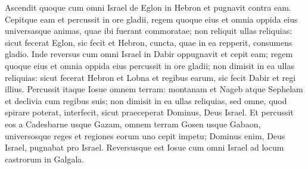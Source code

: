 \begin{biblechapter}
\verse Ascendit quoque cum omni Israel de Eglon in Hebron et pugnavit contra eam.  
\verse Cepitque eam et percussit in ore gladii, regem quoque eius et omnia oppida eius universasque animas, quae ibi fuerant commoratae; non reliquit ullas reliquias: sicut fecerat Eglon, sic fecit et Hebron, cuncta, quae in ea repperit, consumens gladio. 
\verse Inde reversus cum omni Israel in Dabir oppugnavit 
\verse et cepit eam; regem quoque eius et omnia oppida eius percussit in ore gladii; non dimisit in ea ullas reliquias: sicut fecerat Hebron et Lobna et regibus earum, sic fecit Dabir et regi illius. 
\verse Percussit itaque Iosue omnem terram: montanam et Nageb atque Sephelam et declivia cum regibus suis; non dimisit in ea ullas reliquias, sed omne, quod spirare poterat, interfecit, sicut praeceperat Dominus, Deus Israel. 
\verse Et percussit eos a Cadesbarne usque Gazam, omnem terram Gosen usque Gabaon, 
\verse universosque reges et regiones eorum uno cepit impetu; Dominus enim, Deus Israel, pugnabat pro Israel. 
\verse Reversusque est Iosue cum omni Israel ad locum castrorum in Galgala. 
\end{biblechapter}

